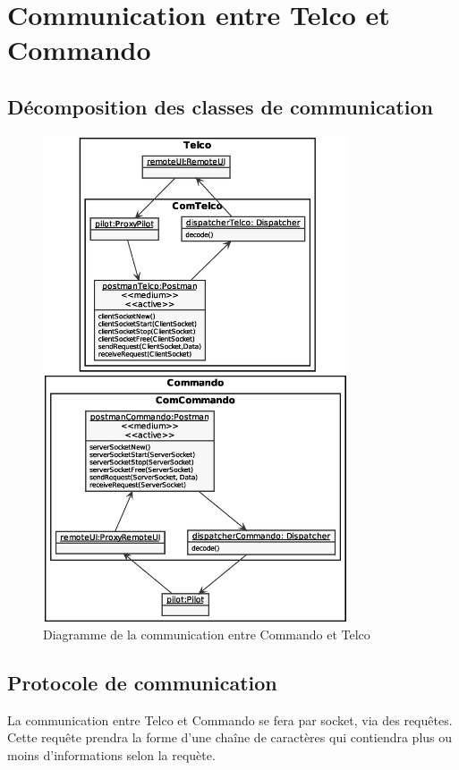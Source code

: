 \section{Communication entre Telco et Commando}

\subsection{Décomposition des classes de communication}
\begin{figure}[H] 
    \centering
    \includegraphics[width=0.8\textwidth]{img/diagrammeCommunication.eps}
    \caption{Diagramme de la communication entre Commando et Telco}
\end{figure}

\subsection{Protocole de communication}

La communication entre Telco et Commando se fera par socket, via des requêtes. Cette requête prendra la 
forme d’une chaîne de caractères qui contiendra plus ou moins d’informations selon la requète. 
\\

